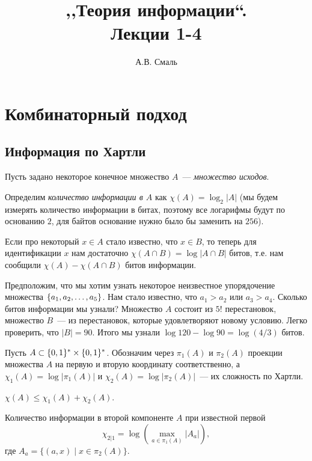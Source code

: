 \documentclass[12pt]{article}
\title{,,Теория информации``.\\ Лекции 1-4}
\author{А.В. Смаль}
\begin{document}
\maketitle

\section{Комбинаторный подход}
\subsection{Информация по Хартли}
Пусть задано некоторое конечное множество \(A\)~--- \emph{множество исходов}.
\begin{definition}[1928]
Определим \emph{количество информации в \(A\)} как \(\chi(A) = \log_2|A|\) (мы будем измерять количество информации в битах, поэтому все логарифмы будут по основанию \(2\), для байтов основание нужно было бы заменить на \(256\)).
\end{definition}

Если про некоторый \(x\in A\) стало известно, что \(x\in B\), то теперь для идентификации \(x\) нам достаточно \(\chi(A\cap B) = \log |A\cap B|\) битов, т.е. нам сообщили \(\chi(A) - \chi(A\cap B)\) битов информации.

\begin{example}
    Предположим, что мы хотим узнать некоторое неизвестное упорядочение множества $\{{a}_1,{a}_2,\dotsc,{a}_{5}\}$. Нам стало известно,
    что \(a_1>a_2\) или \(a_3>a_4\). Сколько битов информации мы узнали? Множество \(A\) состоит из \(5!\) перестановок,
    множество \(B\)~--- из перестановок, которые удовлетворяют новому условию. Легко проверить, что \(|B| = 90\). Итого
    мы узнали \(\log 120 - \log 90 = \log(4/3)\) битов.
\end{example}

Пусть \(A\subset\{0,1\}^*\times\{0,1\}^*\). Обозначим через \(\pi_1(A)\) и \(\pi_2(A)\) проекции множества \(A\) на первую и вторую координату соответственно, а \(\chi_1(A) = \log|\pi_1(A)|\) и \(\chi_2(A) = \log|\pi_2(A)|\)~--- их сложность по Хартли.

\begin{theorem} 
\(\chi(A) \le \chi_1(A) + \chi_2(A)\).
\end{theorem}

\begin{definition}
Количество информации в второй компоненте \(A\) при известной первой
\[\chi_{2|1} = \log\left(\max_{a\in\pi_1(A)} |A_a|\right),\]
где $A_a = \{(a, x) \mid x\in \pi_2(A)\}$.
\end{definition}
\end{document}
